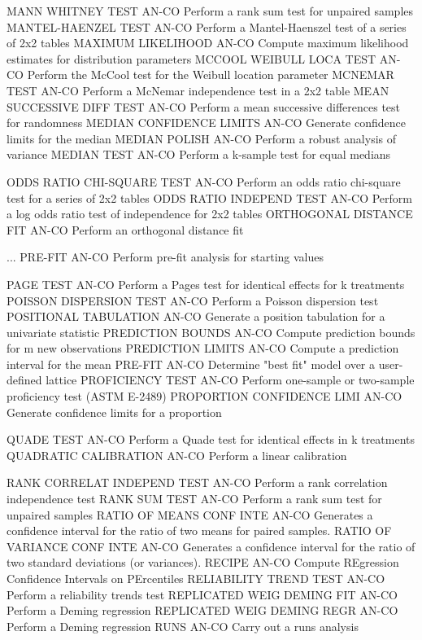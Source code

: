 MANN WHITNEY TEST           AN-CO Perform a rank sum test for unpaired samples
MANTEL-HAENZEL TEST         AN-CO Perform a Mantel-Haenszel test of a series of 2x2 tables
MAXIMUM LIKELIHOOD          AN-CO Compute maximum likelihood estimates for distribution parameters
MCCOOL WEIBULL LOCA TEST    AN-CO Perform the McCool test for the Weibull location parameter
MCNEMAR TEST                AN-CO Perform a McNemar independence test in a 2x2 table
MEAN SUCCESSIVE DIFF TEST   AN-CO Perform a mean successive differences test for randomness
MEDIAN CONFIDENCE LIMITS    AN-CO Generate confidence limits for the median
MEDIAN POLISH               AN-CO Perform a robust analysis of variance
MEDIAN TEST                 AN-CO Perform a k-sample test for equal medians

ODDS RATIO CHI-SQUARE TEST  AN-CO Perform an odds ratio chi-square test for a series of 2x2 tables
ODDS RATIO INDEPEND TEST    AN-CO Perform a log odds ratio test of independence for 2x2 tables
ORTHOGONAL DISTANCE FIT     AN-CO Perform an orthogonal distance fit

... PRE-FIT                 AN-CO Perform pre-fit analysis for starting values

PAGE TEST                   AN-CO Perform a Pages test for identical effects for k treatments
POISSON DISPERSION TEST     AN-CO Perform a Poisson dispersion test
POSITIONAL TABULATION       AN-CO Generate a position tabulation for a univariate statistic
PREDICTION BOUNDS           AN-CO Compute prediction bounds for m new observations
PREDICTION LIMITS           AN-CO Compute a prediction interval for the mean
PRE-FIT                     AN-CO Determine "best fit" model over a user-defined lattice
PROFICIENCY TEST            AN-CO Perform one-sample or two-sample proficiency test (ASTM E-2489)
PROPORTION CONFIDENCE LIMI  AN-CO Generate confidence limits for a proportion

QUADE TEST                  AN-CO Perform a Quade test for identical effects in k treatments
QUADRATIC CALIBRATION       AN-CO Perform a linear calibration

RANK CORRELAT INDEPEND TEST AN-CO Perform a rank correlation independence test
RANK SUM TEST               AN-CO Perform a rank sum test for unpaired samples
RATIO OF MEANS CONF INTE    AN-CO Generates a confidence interval for the ratio of two means for paired samples.
RATIO OF VARIANCE CONF INTE AN-CO Generates a confidence interval for the ratio of two standard deviations (or variances).
RECIPE                      AN-CO Compute REgression Confidence Intervals on PErcentiles
RELIABILITY TREND TEST      AN-CO Perform a reliability trends test
REPLICATED WEIG DEMING FIT  AN-CO Perform a Deming regression
REPLICATED WEIG DEMING REGR AN-CO Perform a Deming regression
RUNS                        AN-CO Carry out a runs analysis

